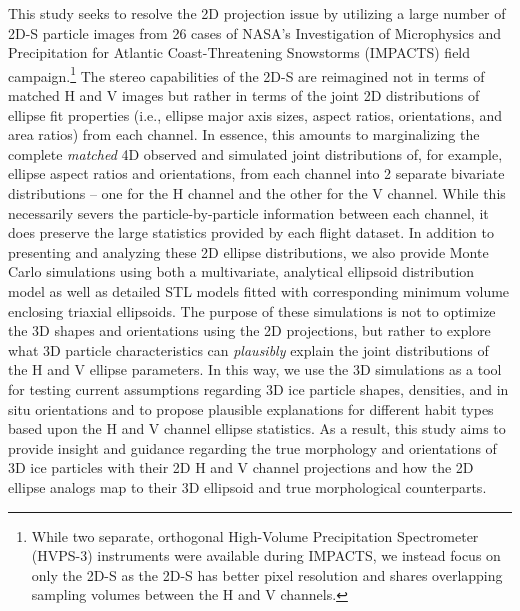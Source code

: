 \documentclass[amt, manuscript]{copernicus}
\begin{document}
This study seeks to resolve the 2D projection issue by utilizing a large number of 2D-S particle images from 26 cases of NASA's Investigation of Microphysics and Precipitation for Atlantic Coast-Threatening Snowstorms (IMPACTS) field campaign.\footnote{While two separate, orthogonal High-Volume Precipitation Spectrometer (HVPS-3) instruments were available during IMPACTS, we instead focus on only the 2D-S as the 2D-S has better pixel resolution and shares overlapping sampling volumes between the H and V channels.} The stereo capabilities of the 2D-S are reimagined not in terms of matched H and V images but rather in terms of the joint 2D distributions of ellipse fit properties (i.e., ellipse major axis sizes, aspect ratios, orientations, and area ratios) from each channel. In essence, this amounts to marginalizing the complete \textit{matched} 4D observed and simulated joint distributions of, for example, ellipse aspect ratios and orientations, from each channel into 2 separate bivariate distributions -- one for the H channel and the other for the V channel. While this necessarily severs the particle-by-particle information between each channel, it does preserve the large statistics provided by each flight dataset. In addition to presenting and analyzing these 2D ellipse distributions, we also provide Monte Carlo simulations using both a multivariate, analytical ellipsoid distribution model as well as detailed STL models fitted with corresponding minimum volume enclosing triaxial ellipsoids. The purpose of these simulations is not to optimize the 3D shapes and orientations using the 2D projections, but rather to explore what 3D particle characteristics can \textit{plausibly} explain the joint distributions of the H and V ellipse parameters. In this way, we use the 3D simulations as a tool for testing current assumptions regarding 3D ice particle shapes, densities, and in situ orientations and to propose plausible explanations for different habit types based upon the H and V channel ellipse statistics. As a result, this study aims to provide insight and guidance regarding the true morphology and orientations of 3D ice particles with their 2D H and V channel projections and how the 2D ellipse analogs map to their 3D ellipsoid and true morphological counterparts.


\end{document}
